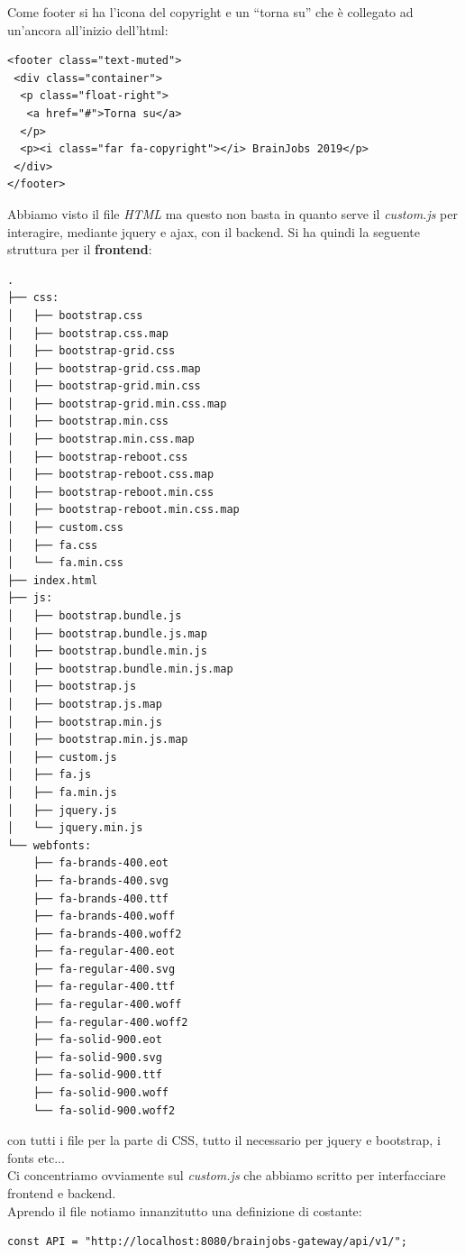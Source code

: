 \documentclass[a4paper,12pt, oneside]{book}
\begin{document}
Come footer si ha l'icona del copyright e un ``torna su'' che è collegato ad un'ancora all'inizio dell'html:
\begin{shaded}
\begin{verbatim}
<footer class="text-muted">
 <div class="container">
  <p class="float-right">
   <a href="#">Torna su</a>
  </p>
  <p><i class="far fa-copyright"></i> BrainJobs 2019</p>
 </div>
</footer>
\end{verbatim}
\end{shaded}
Abbiamo visto il file \textit{HTML} ma questo non basta in quanto serve il \textit{custom.js} per interagire, mediante jquery e ajax, con il backend. Si ha quindi la seguente struttura per il \textbf{frontend}:
\begin{shaded}
\begin{verbatim}
.
├── css:
│   ├── bootstrap.css
│   ├── bootstrap.css.map
│   ├── bootstrap-grid.css
│   ├── bootstrap-grid.css.map
│   ├── bootstrap-grid.min.css
│   ├── bootstrap-grid.min.css.map
│   ├── bootstrap.min.css
│   ├── bootstrap.min.css.map
│   ├── bootstrap-reboot.css
│   ├── bootstrap-reboot.css.map
│   ├── bootstrap-reboot.min.css
│   ├── bootstrap-reboot.min.css.map
│   ├── custom.css
│   ├── fa.css
│   └── fa.min.css
├── index.html
├── js:
│   ├── bootstrap.bundle.js
│   ├── bootstrap.bundle.js.map
│   ├── bootstrap.bundle.min.js
│   ├── bootstrap.bundle.min.js.map
│   ├── bootstrap.js
│   ├── bootstrap.js.map
│   ├── bootstrap.min.js
│   ├── bootstrap.min.js.map
│   ├── custom.js
│   ├── fa.js
│   ├── fa.min.js
│   ├── jquery.js
│   └── jquery.min.js
└── webfonts:
    ├── fa-brands-400.eot
    ├── fa-brands-400.svg
    ├── fa-brands-400.ttf
    ├── fa-brands-400.woff
    ├── fa-brands-400.woff2
    ├── fa-regular-400.eot
    ├── fa-regular-400.svg
    ├── fa-regular-400.ttf
    ├── fa-regular-400.woff
    ├── fa-regular-400.woff2
    ├── fa-solid-900.eot
    ├── fa-solid-900.svg
    ├── fa-solid-900.ttf
    ├── fa-solid-900.woff
    └── fa-solid-900.woff2
\end{verbatim}
\end{shaded}
con tutti i file per la parte di CSS, tutto il necessario per jquery e bootstrap, i fonts etc...\\
Ci concentriamo ovviamente sul \textit{custom.js} che abbiamo scritto per interfacciare frontend e backend.\\
Aprendo il file notiamo innanzitutto una definizione di costante:
\begin{shaded}
\begin{verbatim}
const API = "http://localhost:8080/brainjobs-gateway/api/v1/";
\end{verbatim}
\end{shaded}
\end{document}
